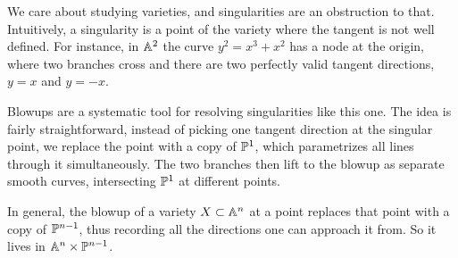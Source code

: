 \documentclass[12pt]{amsproc}
\begin{document}
    We care about studying varieties, and singularities are an obstruction to that. Intuitively, a singularity is a point of the variety where the tangent is not well defined. For instance, in $\A^2$ the curve $y^2 = x^3 + x^2$ has a node at the origin, where two branches cross and there are two perfectly valid tangent directions, $y = x$ and $y = -x$.




    Blowups are a systematic tool for resolving singularities like this one. The idea is fairly straightforward, instead of picking one tangent direction at the singular point, we replace the point with a copy of $\P^1$, which parametrizes all lines through it simultaneously. The two branches then lift to the blowup as separate smooth curves, intersecting $\P^1$ at different points. 
    




  
    In general, the blowup of a variety $X \subset \A^n$ at a point replaces that point with a copy of $\P^{n-1}$, thus recording all the directions one can approach it from. So it lives in $\A^n \times \P^{n-1}$. 
\end{document}
